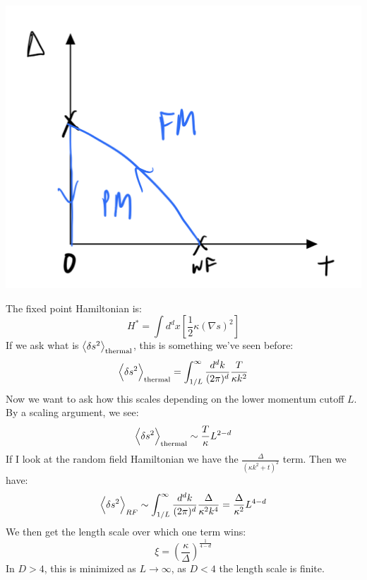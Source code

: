 \begin{center}
    \includegraphics[scale=0.35]{Lectures/Figures/lec13-randomrgflow.png}
\end{center}

The fixed point Hamiltonian is:
\begin{equation}
    H^* = \int d^dx \left[\frac{1}{2}\kappa(\nabla s)^2\right]
\end{equation}
If we ask what is $\left< \delta s^2 \right>_{\text{thermal}}$, this is something we've seen before:
\begin{equation}
    \left< \delta s^2 \right>_{\text{thermal}} = \int_{1/L}^\infty \frac{d^dk}{(2\pi)^d}\frac{T}{\kappa k^2}
\end{equation}
Now we want to ask how this scales depending on the lower momentum cutoff $L$. By a scaling argument, we see:
\begin{equation}
    \left< \delta s^2 \right>_{\text{thermal}} \sim \frac{T}{\kappa}L^{2-d}
\end{equation}
If I look at the random field Hamiltonian we have the $\frac{\Delta}{(\kappa k^2 + t)^2}$ term. Then we have:
\begin{equation}
    \left< \delta s^2 \right>_{RF} \sim \int_{1/L}^\infty \frac{d^dk}{(2\pi)^d}\frac{\Delta}{\kappa^2k^4} = \frac{\Delta}{\kappa^2}L^{4-d}
\end{equation}
We then get the length scale over which one term wins:
\begin{equation}
    \xi = \left(\frac{\kappa}{\Delta}\right)^{\frac{1}{4-d}}
\end{equation}
In $D > 4$, this is minimized as $L \to \infty$, as $D < 4$ the length scale is finite.


